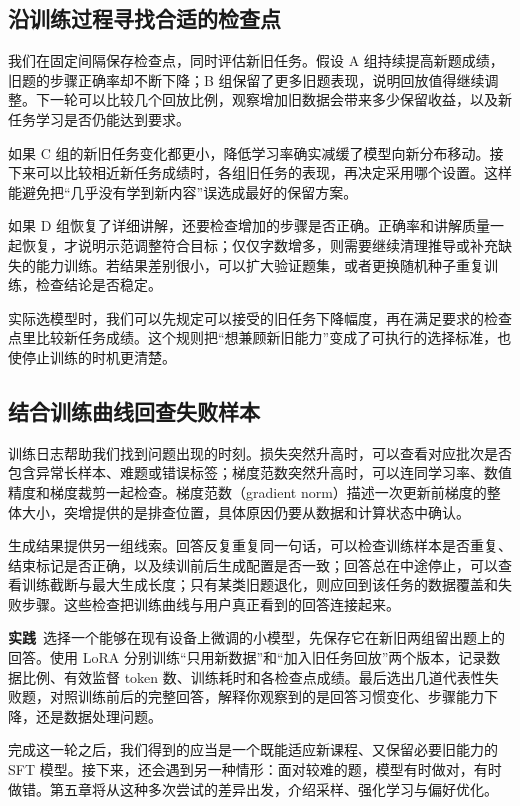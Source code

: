 \subsection{沿训练过程寻找合适的检查点}

我们在固定间隔保存检查点，同时评估新旧任务。假设 A 组持续提高新题成绩，旧题的步骤正确率却不断下降；B 组保留了更多旧题表现，说明回放值得继续调整。下一轮可以比较几个回放比例，观察增加旧数据会带来多少保留收益，以及新任务学习是否仍能达到要求。

如果 C 组的新旧任务变化都更小，降低学习率确实减缓了模型向新分布移动。接下来可以比较相近新任务成绩时，各组旧任务的表现，再决定采用哪个设置。这样能避免把“几乎没有学到新内容”误选成最好的保留方案。

如果 D 组恢复了详细讲解，还要检查增加的步骤是否正确。正确率和讲解质量一起恢复，才说明示范调整符合目标；仅仅字数增多，则需要继续清理推导或补充缺失的能力训练。若结果差别很小，可以扩大验证题集，或者更换随机种子重复训练，检查结论是否稳定。

实际选模型时，我们可以先规定可以接受的旧任务下降幅度，再在满足要求的检查点里比较新任务成绩。这个规则把“想兼顾新旧能力”变成了可执行的选择标准，也使停止训练的时机更清楚。

\subsection{结合训练曲线回查失败样本}

训练日志帮助我们找到问题出现的时刻。损失突然升高时，可以查看对应批次是否包含异常长样本、难题或错误标签；梯度范数突然升高时，可以连同学习率、数值精度和梯度裁剪一起检查。梯度范数（gradient norm）描述一次更新前梯度的整体大小，突增提供的是排查位置，具体原因仍要从数据和计算状态中确认。

生成结果提供另一组线索。回答反复重复同一句话，可以检查训练样本是否重复、结束标记是否正确，以及续训前后生成配置是否一致；回答总在中途停止，可以查看训练截断与最大生成长度；只有某类旧题退化，则应回到该任务的数据覆盖和失败步骤。这些检查把训练曲线与用户真正看到的回答连接起来。

\textbf{实践}~选择一个能够在现有设备上微调的小模型，先保存它在新旧两组留出题上的回答。使用 LoRA 分别训练“只用新数据”和“加入旧任务回放”两个版本，记录数据比例、有效监督 token 数、训练耗时和各检查点成绩。最后选出几道代表性失败题，对照训练前后的完整回答，解释你观察到的是回答习惯变化、步骤能力下降，还是数据处理问题。

完成这一轮之后，我们得到的应当是一个既能适应新课程、又保留必要旧能力的 SFT 模型。接下来，还会遇到另一种情形：面对较难的题，模型有时做对，有时做错。第五章将从这种多次尝试的差异出发，介绍采样、强化学习与偏好优化。
